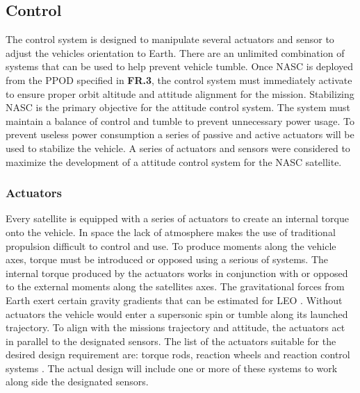 \subsection{Control}
 The control system is designed to manipulate several actuators and sensor to adjust the vehicles orientation to Earth. There are an unlimited combination of systems that can be used to help prevent vehicle tumble. Once NASC is deployed from the PPOD specified in \textbf{FR.3}, the control system must immediately activate to ensure proper orbit altitude and attitude alignment for the mission. Stabilizing NASC is the primary objective for the attitude control system. The system must maintain a balance of control and tumble to prevent unnecessary power usage. To prevent useless power consumption a series of passive and active actuators will be used to stabilize the vehicle. A series of actuators and sensors were considered to maximize the development of a attitude control system for the NASC satellite.
\subsubsection{Actuators}
Every satellite is equipped with a series of actuators to create an internal torque onto the vehicle. In space the lack of atmosphere makes the use of traditional propulsion difficult to control and use. To produce moments along the vehicle axes, torque must be introduced or opposed using a serious of systems. The internal torque produced by the actuators works in conjunction with or opposed to the external moments along the satellites axes. The gravitational forces from Earth exert certain gravity gradients that can be estimated for LEO \cite{AttSim}. Without actuators the vehicle would enter a supersonic spin or tumble along its launched trajectory. To align with the missions trajectory and attitude, the actuators act in parallel to the designated sensors. The list of the actuators suitable for the desired design requirement are: torque rods, reaction wheels and reaction control systems . The actual design will include one or more of these systems to work along side the designated sensors. 
%
